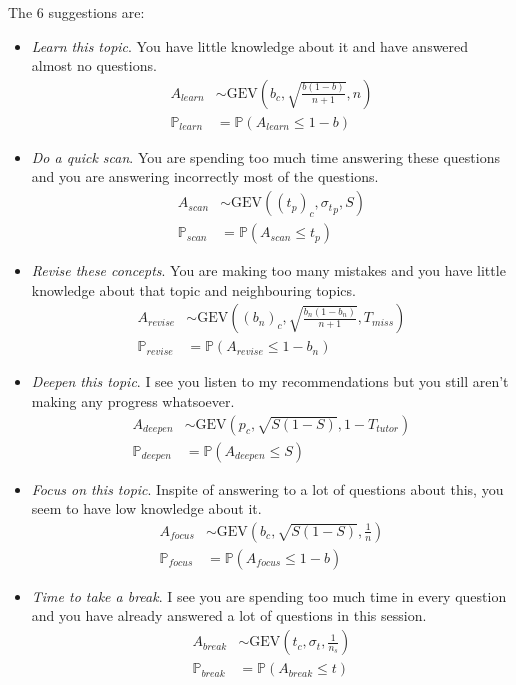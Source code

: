 \documentclass{article}
\newcommand{\0}{\mathbbold{0}}
\newcommand{\1}{\mathds{1}}
\newcommand{\GEV}[3]{\text{GEV}\!\left(#1,#2,#3\right)}
\begin{document}
The $6$ suggestions are:
\begin{itemize}
    \item \textsl{Learn this topic}. You have little knowledge about it and have answered almost no questions.
    \begin{align*}
        A_\mathit{learn} &\sim \GEV{b_c}{\sqrt{\frac{b(1-b)}{n+1}}}{n} \\
        \mathbb{P}_\mathit{learn} &= \mathbb{P}\left(A_\mathit{learn} \le 1 - b\right)
    \end{align*}
    \item \textsl{Do a quick scan}. You are spending too much time answering these questions and you are answering incorrectly most of the questions.
    \begin{align*}
        A_\mathit{scan} &\sim \GEV{(t_p)_c}{{\sigma_t}_p}{S} \\
        \mathbb{P}_\mathit{scan} &= \mathbb{P}\left(A_\mathit{scan} \le t_p\right)
    \end{align*}
    \item \textsl{Revise these concepts}. You are making too many mistakes and you have little knowledge about that topic and neighbouring topics.
    \begin{align*}
        A_\mathit{revise} &\sim \GEV{(b_n)_c}{\sqrt{\frac{b_n(1-b_n)}{n+1}}}{T_\mathit{miss}} \\
        \mathbb{P}_\mathit{revise} &= \mathbb{P}\left(A_\mathit{revise} \le 1 - b_n\right)
    \end{align*}
    \item \textsl{Deepen this topic}. I see you listen to my recommendations but you still aren't making any progress whatsoever.
    \begin{align*}
        A_\mathit{deepen} &\sim \GEV{p_c}{\sqrt{S(1-S)}}{1-T_\mathit{tutor}} \\
        \mathbb{P}_\mathit{deepen} &= \mathbb{P}\left(A_\mathit{deepen} \le S\right)
    \end{align*}
    \item \textsl{Focus on this topic}. Inspite of answering to a lot of questions about this, you seem to have low knowledge about it.
    \begin{align*}
        A_\mathit{focus} &\sim \GEV{b_c}{\sqrt{S(1-S)}}{\frac{1}{n}} \\
        \mathbb{P}_\mathit{focus} &= \mathbb{P}\left(A_\mathit{focus} \le 1 - b\right)
    \end{align*}
    \item \textsl{Time to take a break}. I see you are spending too much time in every question and you have already answered a lot of questions in this session.
    \begin{align*}
        A_\mathit{break} &\sim \GEV{t_c}{\sigma_t}{\frac{1}{n_s}} \\
        \mathbb{P}_\mathit{break} &= \mathbb{P}\left(A_\mathit{break} \le t\right)
    \end{align*}
\end{itemize}
\end{document}
